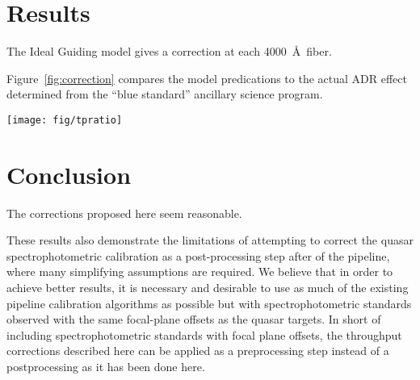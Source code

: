 \documentclass[preprint2]{aastex}
\providecommand{\fig}[1]{Figure~\ref{fig:#1}}
\begin{document}
\section{Results}

The Ideal Guiding model gives a correction at each 4000~\AA~fiber. 

\fig{correction} compares the model predications to the actual ADR effect determined from the ``blue standard'' ancillary science program.

\begin{figure*}
\centering
\texttt{[image: fig/tpratio]}
\caption{The corrections for all $\lambda_{eff}$ = 4000~\AA~targets on a plate using the mean observing hour angle and mean PSF size. The transparent lines correspond to correction curves for individual targets while the thick opaque lines correspond the coadded spectrum ratios of the standard and alternate reductions for ancillary targets on this plate. The blue and red colors indicate fibers 1-500 and 501-1000 respectively.}
\label{fig:correction}
\end{figure*}

\section{Conclusion}

The corrections proposed here seem reasonable.

These results also demonstrate the limitations of attempting to correct the quasar spectrophotometric calibration as a post-processing step after of the pipeline, where many simplifying assumptions are required. We believe that in order to achieve better results, it is necessary and desirable to use as much of the existing pipeline calibration algorithms as possible but with spectrophotometric standards observed with the same focal-plane offsets as the quasar targets. In short of including spectrophotometric standards with focal plane offsets, the throughput corrections described here can be applied as a preprocessing step instead of a postprocessing as it has been done here.



\end{document}
